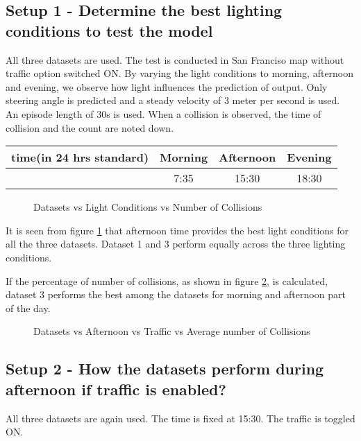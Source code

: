 \subsection{Setup 1 - Determine the best lighting conditions to test the model}
\label{chapter05subsec:setup1}
All three datasets are used. The test is conducted in San Franciso map without traffic
option switched ON. By varying the light conditions to morning, afternoon and evening, we
observe how light influences the prediction of output. Only steering angle is predicted
and a steady velocity of 3 meter per second is used. An episode length of 30s is used.
When a collision is observed, the time of collision and the count are noted down.
\begin{table}[t]
    \centering
\begin{tabular}{|c c c c|}
    \hline
    time(in 24 hrs standard) & Morning & Afternoon & Evening \\\hline
      & 7:35 & 15:30 & 18:30 \\\hline
\end{tabular}
\end{table}

\begin{figure}
	\centering
    \def\svgwidth{0.6\textwidth}
    \caption{Datasets vs Light Conditions vs Number of Collisions}
    \label{fig:dsvslcvsncolsetup1}
\end{figure}

It is seen from figure \ref{fig:dsvslcvsncolsetup1} that afternoon time provides the best light conditions for all the three
datasets. Dataset 1 and 3 perform equally across the three lighting conditions.

If the percentage of number of collisions, as shown in figure
\ref{fig:dsvslcvstrafficavgncolsetup1a}, is calculated, dataset 3 performs the best among
the datasets for morning and afternoon part of the day.
\begin{figure}
	\centering
    \def\svgwidth{0.6\textwidth}
    \caption{Datasets vs Afternoon vs Traffic vs Average number of Collisions}
    \label{fig:dsvslcvstrafficavgncolsetup1a}
\end{figure}

\subsection{Setup 2 - How the datasets perform during afternoon if traffic is enabled?}
All three datasets are again used. The time is fixed at 15:30. The traffic is toggled ON.

